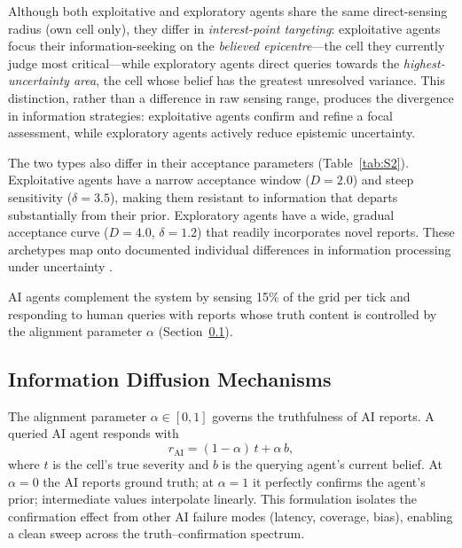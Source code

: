 \documentclass[pdflatex,sn-apa]{sn-jnl}%
\begin{document}
Although both exploitative and exploratory agents share the same direct-sensing
radius (own cell only), they differ in \emph{interest-point targeting}: exploitative
agents focus their information-seeking on the \emph{believed epicentre}---the
cell they currently judge most critical---while exploratory agents direct queries
towards the \emph{highest-uncertainty area}, the cell whose belief has the greatest
unresolved variance.
This distinction, rather than a difference in raw sensing range, produces the
divergence in information strategies: exploitative agents confirm and refine a focal
assessment, while exploratory agents actively reduce epistemic uncertainty.

The two types also differ in their acceptance parameters (Table~\ref{tab:S2}).
Exploitative agents have a narrow acceptance window ($D=2.0$) and steep
sensitivity ($\delta=3.5$), making them resistant to information that departs
substantially from their prior.
Exploratory agents have a wide, gradual acceptance curve ($D=4.0$, $\delta=1.2$)
that readily incorporates novel reports.
These archetypes map onto documented individual differences in information
processing under uncertainty \citep{HertwigEngel2016,March1991}.

AI agents complement the system by sensing 15\% of the grid per tick and responding
to human queries with reports whose truth content is controlled by the alignment
parameter $\alpha$ (Section~\ref{sec:alignment}).

\subsection{Information Diffusion Mechanisms}
\label{sec:alignment}

The alignment parameter $\alpha\in[0,1]$ governs the truthfulness of AI reports.
A queried AI agent responds with
%
\begin{equation}
  r_{\mathrm{AI}} = (1-\alpha)\,t + \alpha\,b,
  \label{eq:alignment}
\end{equation}
%
where $t$ is the cell's true severity and $b$ is the querying agent's current
belief.
At $\alpha=0$ the AI reports ground truth; at $\alpha=1$ it perfectly confirms the
agent's prior; intermediate values interpolate linearly.
This formulation isolates the confirmation effect from other AI failure modes
(latency, coverage, bias), enabling a clean sweep across the truth--confirmation
spectrum.
\end{document}
